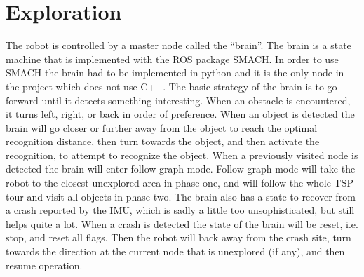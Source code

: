 \section{Exploration}

The robot is controlled by a master node called the ``brain''. 
The brain is a state machine that is implemented with the ROS package SMACH. 
In order to use SMACH the brain had to be implemented in python and it is the only node in the project which does not use C++.
The basic strategy of the brain is to go forward until it detects something interesting. 
When an obstacle is encountered, it turns left, right, or back in order of preference. 
When an object is detected the brain will go closer or further away from the object to reach the optimal recognition distance, then turn towards the object, and then activate the recognition, to attempt to recognize the object.
When a previously visited node is detected the brain will enter follow graph mode.
Follow graph mode will take the robot to the closest unexplored area in phase one, and will follow the whole TSP tour and visit all objects in phase two.
The brain also has a state to recover from a crash reported by the IMU, which is sadly a little too unsophisticated, but still helps quite a lot. 
When a crash is detected the state of the brain will be reset, i.e. stop, and reset all flags. 
Then the robot will back away from the crash site, turn towards the direction at the current node that is unexplored (if any), and then resume operation.

